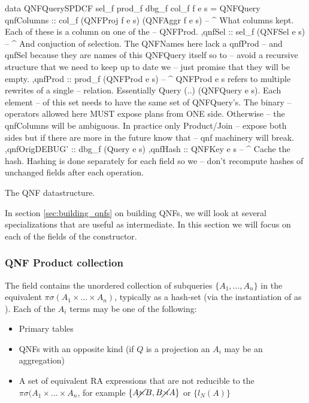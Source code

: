 \begin{code}
  \begin{haskellcode}
    data QNFQuerySPDCF sel_f prod_f dbg_f col_f f e s =
      QNFQuery
      { qnfColumns :: col_f (QNFProj f e s) (QNFAggr f e s)
        -- ^ What columns kept. Each of these is a column on one of the
        -- QNFProd.
        ,qnfSel :: sel_f (QNFSel e s)
        -- ^ And conjuction of selection. The QNFNames here lack a qnfProd
        -- and qnfSel because they are names of this QNFQuery itself so to
        -- avoid a recursive structure that we need to keep up to date we
        -- just promise that they will be empty.
        ,qnfProd :: prod_f (QNFProd e s)
        -- ^ QNFProd e s refers to multiple rewrites of a single
        -- relation. Essentially {Query (..) (QNFQuery e s)}. Each element
        -- of this set needs to have the same set of QNFQuery's. The binary
        -- operators allowed here MUST expose plans from ONE side. Otherwise
        -- the qnfColumns will be ambiguous. In practice only Product/Join
        -- expose both sides but if there are more in the future know that
        -- qnf machinery will break.
        ,qnfOrigDEBUG' :: dbg_f (Query e s)
        ,qnfHash :: QNFKey e s
        -- ^ Cache the hash. Hashing is done separately for each field so we
        -- don't recompute hashes of unchanged fields after each operation.
      }
  \end{haskellcode}
  \caption{\label{lst:qnf_struct}The QNF datastructure.}
\end{code}

In section \ref{sec:building_qnfs} on building QNFs,
we will look at several specializations that are useful as intermediate. In this
section we will focus on each of the fields of the 
constructor.

\subsubsection{QNF Product collection}

The  field contains the
unordered collection of subqueries \(\{A_1,... , A_n\}\) in the
equivalent \(\pi \sigma (A_1 \times ... \times A_n)\), typically as a
hash-set (via the instantiation of  as
). Each of the \(A_i\) terms may be one of the following:

\begin{itemize}
\item Primary tables
\item QNFs with an opposite kind  (if \(Q\) is a projection an
  \(A_i\) may be an aggregation)
\item A set of equivalent RA expressions that are not reducible to the
  \(\pi \sigma(A_1 \times ... \times A_n\), for example \(\{A \cancel\ltimes B,B \cancel\rtimes A\}\)
  or \(\{l_N(A)\}\)
\end{itemize}


